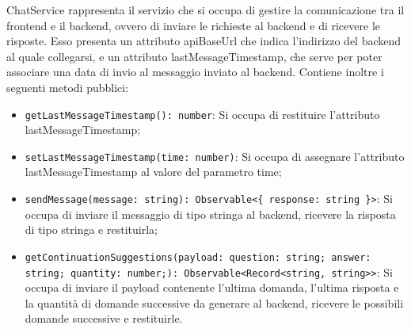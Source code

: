\label{sec:chat_service_frontend}
ChatService rappresenta il servizio che si occupa di gestire la comunicazione tra il frontend e il backend, ovvero di inviare le richieste al backend e di ricevere le risposte. Esso presenta un attributo apiBaseUrl che indica l'indirizzo del backend al quale collegarsi, e un attributo lastMessageTimestamp, che serve per poter associare una data di invio al messaggio inviato al backend.
Contiene inoltre i seguenti metodi pubblici:
\begin{itemize}
    \item \texttt{getLastMessageTimestamp(): number}: Si occupa di restituire l'attributo lastMessageTimestamp;
    \item \texttt{setLastMessageTimestamp(time: number)}: Si occupa di assegnare l'attributo lastMessageTimestamp al valore del parametro time;
    \item \texttt{sendMessage(message: string): Observable<\{ response: string \}>}: Si occupa di inviare il messaggio di tipo stringa al backend, ricevere la risposta di tipo stringa e restituirla;
    \item \texttt{getContinuationSuggestions(payload: {question: string; answer: string; quantity: number;}): Observable<Record<string, string>>}: Si occupa di inviare il payload contenente l'ultima domanda, l'ultima risposta e la quantità di domande successive da generare al backend, ricevere le possibili domande successive e restituirle.
\end{itemize}

